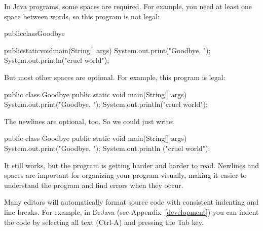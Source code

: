 \documentclass[12pt]{book}
\theoremstyle{exercise}
\begin{document}
In Java programs, some spaces are required.
For example, you need at least one space between words, so this program is not legal:

\begin{code}
publicclassGoodbye{

    publicstaticvoidmain(String[] args) {
        System.out.print("Goodbye, ");
        System.out.println("cruel world");
    }
}
\end{code}

But most other spaces are optional.
For example, this program is legal:

\begin{code}
public class Goodbye {
public static void main(String[] args) {
System.out.print("Goodbye, ");
System.out.println("cruel world");
}
}
\end{code}

The newlines are optional, too.
So we could just write:

\begin{code}
public class Goodbye { public static void main(String[] args) {
System.out.print("Goodbye, "); System.out.println
("cruel world");}}
\end{code}

It still works, but the program is getting harder and harder to read.
Newlines and spaces are important for organizing your program visually, making it easier to understand the program and find errors when they occur.

Many editors will automatically format source code with consistent indenting and line breaks.
For example, in DrJava (see Appendix~\ref{development}) you can indent the code by selecting all text ({\sf Ctrl-A}) and pressing the {\sf Tab} key.


%

\end{document}
